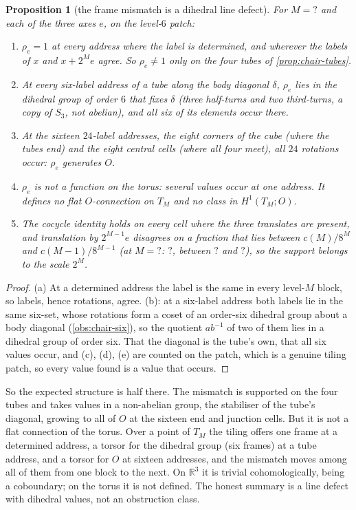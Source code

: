 \documentclass[11pt,a4paper]{article}
\newcommand{\SSChMisMs}{?}\newcommand{\SSChMisFirst}{?}\newcommand{\SSChMisLast}{?}\newcommand{\SSChMisNonId}{?}\newcommand{\SSChMisHalf}{?}\newcommand{\SSChMisBound}{?}\newcommand{\SSChMisBoundPrev}{?}
\newcommand{\RR}{\mathbb{R}}
\theoremstyle{plain}
\newtheorem{proposition}{Proposition}
\theoremstyle{definition}
\begin{document}
\begin{proposition}[the frame mismatch is a dihedral line defect]
\label{prop:chair-mismatch}
For $M=\SSChMisMs$ and each of the three axes $e$, on the level-$6$ patch:
\begin{enumerate}[label=(\alph*),leftmargin=*]
\item $\rho_e=1$ at every address where the label is determined, and wherever the labels of $x$ and $x+2^Me$ agree. So $\rho_e\ne1$ only on the four tubes
of \cref{prop:chair-tubes}.
\item At every six-label address of a tube along the body diagonal $\delta$, $\rho_e$ lies in the dihedral group of order $6$ that fixes $\delta$
(three half-turns and two third-turns, a copy of $S_3$, not abelian), and \emph{all six} of its elements occur there.
\item At the sixteen $24$-label addresses, the eight corners of the cube (where the tubes end) and the eight central cells (where all four meet),
all $24$ rotations occur: $\rho_e$ generates $O$.
\item $\rho_e$ is not a function on the torus: several values occur at one address. It defines no flat $O$-connection on $T_M$ and no
class in $H^1(T_M;O)$.
\item The cocycle identity holds on every cell where the three translates are present, and translation by $2^{M-1}e$ disagrees on a fraction
that lies between $c(M)/8^M$ and $c(M-1)/8^{M-1}$ (at $M=\SSChMisLast$: $\SSChMisHalf$, between $\SSChMisBound$ and $\SSChMisBoundPrev$), so the support belongs to the scale $2^M$.
\end{enumerate}
\end{proposition}

\begin{proof}
(a) At a determined address the label is the same in every level-$M$ block, so labels, hence rotations, agree. (b): at a six-label address both labels lie in the same six-set, whose rotations form a coset of an order-six dihedral group about a body
diagonal (\cref{obs:chair-six}), so the quotient $ab^{-1}$ of two of them lies in a dihedral group of order six. That the diagonal is the tube's own, that all six
values occur, and (c), (d), (e) are counted on the patch, which is a genuine tiling patch, so every value found is a value that occurs.
\end{proof}

So the expected structure is half there. The mismatch is supported on the four tubes and takes values in a non-abelian group, the stabiliser of the tube's diagonal,
growing to all of $O$ at the sixteen end and junction cells. But it is not a flat connection of the torus. Over a point of $T_M$
the tiling offers one frame at a determined address, a torsor for the dihedral group (six frames) at a tube address, and a torsor for $O$ at sixteen
addresses, and the mismatch moves among all of them from one block to the next. On $\RR^3$ it is trivial cohomologically, being a coboundary; on
the torus it is not defined. The honest summary is a line defect with dihedral values, not an obstruction class.
\end{document}
